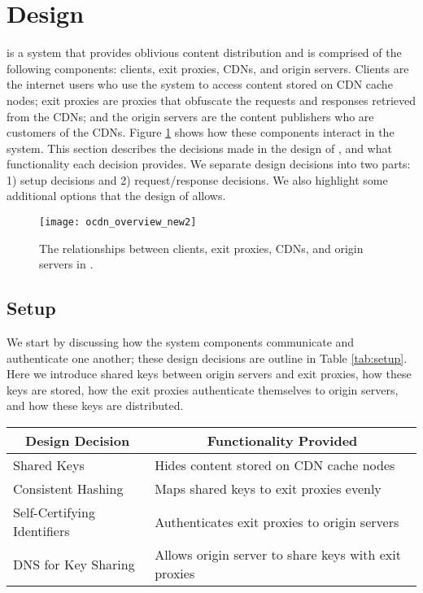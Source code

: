 \section{Design}
\label{sec:design}
\system{} is a system that provides oblivious content distribution and is 
comprised of the following components: clients, exit proxies, CDNs, and origin 
servers.  Clients are the internet users who use the system to access content 
stored on CDN cache nodes; exit proxies are proxies that obfuscate the requests 
and responses retrieved from the CDNs; and the origin servers are the content 
publishers who are customers of the CDNs.  Figure \ref{fig:ocd_overview} shows how
these components interact in the system.  This section describes the decisions 
made in the design of \system{}, and what functionality each decision provides.  
We separate design decisions into two parts: 1) setup decisions and 2) request/response 
decisions.  We also highlight some additional options that the design of 
\system{} allows.

\begin{figure}[t!]
\centering
\texttt{[image: ocdn\_overview\_new2]}
\caption{The relationships between clients, exit proxies, CDNs, and origin servers in 
\system{}.}
\label{fig:ocd_overview}
\end{figure}

\subsection{\system{} Setup}
We start by discussing how the system components communicate and authenticate 
one another; these design decisions are outline in Table \ref{tab:setup}.  Here
we introduce shared keys between origin servers and exit proxies, how these keys are 
stored, how the exit proxies authenticate themselves to origin servers, and how these 
keys are distributed.

\begin{table*}[t!]
\centering
\begin{tabular}{| l | l |} 
\hline
 \multicolumn{1}{|c|}{\bf Design Decision} & \multicolumn{1}{|c|}{\bf Functionality Provided} \\
\hline \hline
 Shared Keys & {Hides content stored on CDN cache nodes} \\
\hline
 Consistent Hashing & {Maps shared keys to exit proxies evenly} \\
\hline
 Self-Certifying Identifiers & {Authenticates exit proxies to origin servers} \\
\hline
 DNS for Key Sharing & {Allows origin server to share keys with exit proxies} \\
\hline
\end{tabular}
\caption{The design decisions associated with the setup and logistical aspects of \system{}, and what these decisions provide.}
\label{tab:setup}
\end{table*}

